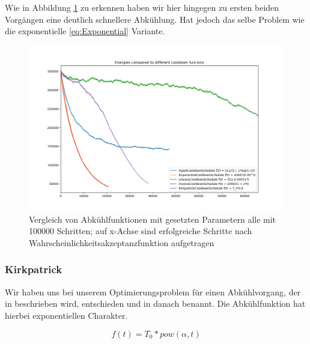 Wie in Abbildung \ref{pic:Cool Down Comparisson} zu erkennen haben wir hier hingegen zu ersten beiden Vorgängen
eine deutlich schnellere Abkühlung. Hat jedoch das selbe Problem wie die exponentielle \ref{eq:Exponential} Variante.

\begin{figure}[H]
    \centering
    \includegraphics[width=\linewidth]{content/simulatedAnnealing/Bilder/Energy_Cooldown_compared_steps_85771.png}
    \caption{Vergleich von Abkühlfunktionen mit gesetzten Parametern
            alle mit 100000 Schritten; auf x-Achse sind erfolgreiche Schritte nach Wahrscheinlichkeitsakzeptanzfunktion
            aufgetragen}
    \label{pic:Cool Down Comparisson}
\end{figure}


\subsubsection{Kirkpatrick}
Wir haben uns bei unserem Optimierungsproblem für einen Abkühlvorgang, der in \cite{Kirkpatrick671} beschrieben wird, 
entschieden und in danach benannt. Die Abkühlfunktion hat hierbei exponentiellen Charakter. 

\begin{equation}\label{eq:ExponentialKirkpatrick}
  f(t) = T_0 * pow(\alpha,t)
\end{equation}

